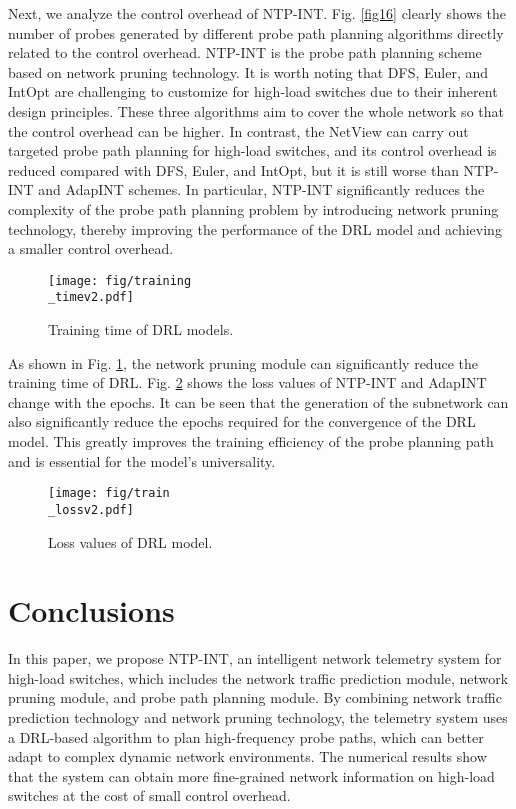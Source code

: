 \documentclass[journal]{IEEEtran}
\begin{document}
Next, we analyze the control overhead of NTP-INT. Fig. \ref{fig16} clearly shows the number of probes generated by different probe path planning algorithms directly related to the control overhead. NTP-INT is the probe path planning scheme based on network pruning technology. It is worth noting that DFS, Euler, and IntOpt are challenging to customize for high-load switches due to their inherent design principles. These three algorithms aim to cover the whole network so that the control overhead can be higher. In contrast, the NetView can carry out targeted probe path planning for high-load switches, and its control overhead is reduced compared with DFS, Euler, and IntOpt, but it is still worse than NTP-INT and AdapINT schemes. In particular, NTP-INT significantly reduces the complexity of the probe path planning problem by introducing network pruning technology, thereby improving the performance of the DRL model and achieving a smaller control overhead.

\begin{figure}
\centering
\setlength{\abovecaptionskip}{0.cm}

\texttt{[image: fig/training\\\_timev2.pdf]}
\caption{Training time of DRL models. }
\label{fig17}
\vspace{-0.1cm}
\end{figure}

As shown in Fig. \ref{fig17}, the network pruning module can significantly reduce the training time of DRL. Fig. \ref{fig18} shows the loss values of NTP-INT and AdapINT change with the epochs. It can be seen that the generation of the subnetwork can also significantly reduce the epochs required for the convergence of the DRL model. This greatly improves the training efficiency of the probe planning path and is essential for the model's universality.

\begin{figure}
\centering
\setlength{\abovecaptionskip}{0.cm}

\texttt{[image: fig/train\\\_lossv2.pdf]}
\caption{Loss values of DRL model. }
\label{fig18}
\vspace{-0.1cm}
\end{figure}


\vspace{0em}
\section{Conclusions}
\label{section8}
\vspace{-0.2em}
In this paper, we propose NTP-INT, an intelligent network telemetry system for high-load switches, which includes the network traffic prediction module, network pruning module, and probe path planning module. By combining network traffic prediction technology and network pruning technology, the telemetry system uses a DRL-based algorithm to plan high-frequency probe paths, which can better adapt to complex dynamic network environments. The numerical results show that the system can obtain more fine-grained network information on high-load switches at the cost of small control overhead.




\vspace{-0.3em}\vspace{-0.3em}%

\end{document}
